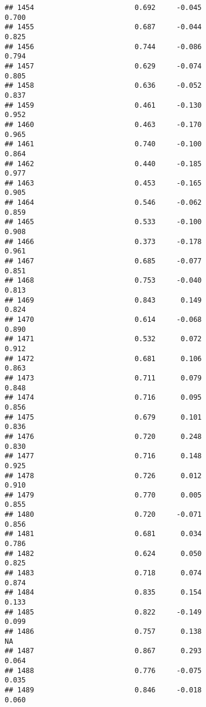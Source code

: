 \documentclass[
]{article}
\begin{document}
\begin{verbatim}
## 1454                        0.692     -0.045                     0.700
## 1455                        0.687     -0.044                     0.825
## 1456                        0.744     -0.086                     0.794
## 1457                        0.629     -0.074                     0.805
## 1458                        0.636     -0.052                     0.837
## 1459                        0.461     -0.130                     0.952
## 1460                        0.463     -0.170                     0.965
## 1461                        0.740     -0.100                     0.864
## 1462                        0.440     -0.185                     0.977
## 1463                        0.453     -0.165                     0.905
## 1464                        0.546     -0.062                     0.859
## 1465                        0.533     -0.100                     0.908
## 1466                        0.373     -0.178                     0.961
## 1467                        0.685     -0.077                     0.851
## 1468                        0.753     -0.040                     0.813
## 1469                        0.843      0.149                     0.824
## 1470                        0.614     -0.068                     0.890
## 1471                        0.532      0.072                     0.912
## 1472                        0.681      0.106                     0.863
## 1473                        0.711      0.079                     0.848
## 1474                        0.716      0.095                     0.856
## 1475                        0.679      0.101                     0.836
## 1476                        0.720      0.248                     0.830
## 1477                        0.716      0.148                     0.925
## 1478                        0.726      0.012                     0.910
## 1479                        0.770      0.005                     0.855
## 1480                        0.720     -0.071                     0.856
## 1481                        0.681      0.034                     0.786
## 1482                        0.624      0.050                     0.825
## 1483                        0.718      0.074                     0.874
## 1484                        0.835      0.154                     0.133
## 1485                        0.822     -0.149                     0.099
## 1486                        0.757      0.138                        NA
## 1487                        0.867      0.293                     0.064
## 1488                        0.776     -0.075                     0.035
## 1489                        0.846     -0.018                     0.060

\end{verbatim}
\end{document}
